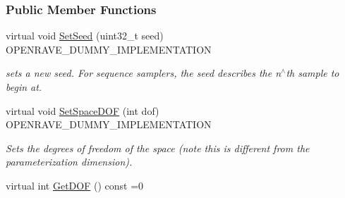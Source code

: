 \subsubsection*{Public Member Functions}
\begin{DoxyCompactItemize}
\item 
\hypertarget{classOpenRAVE_1_1SpaceSamplerBase_a0841286ea829596bce2ceab61ef3645c}{
virtual void \hyperlink{classOpenRAVE_1_1SpaceSamplerBase_a0841286ea829596bce2ceab61ef3645c}{SetSeed} (uint32\_\-t seed) OPENRAVE\_\-DUMMY\_\-IMPLEMENTATION}
\label{classOpenRAVE_1_1SpaceSamplerBase_a0841286ea829596bce2ceab61ef3645c}

\begin{DoxyCompactList}\small\item\em sets a new seed. For sequence samplers, the seed describes the n$^\wedge$th sample to begin at. \item\end{DoxyCompactList}\item 
\hypertarget{classOpenRAVE_1_1SpaceSamplerBase_adda3b11ca875fd0b90192d3700fdc024}{
virtual void \hyperlink{classOpenRAVE_1_1SpaceSamplerBase_adda3b11ca875fd0b90192d3700fdc024}{SetSpaceDOF} (int dof) OPENRAVE\_\-DUMMY\_\-IMPLEMENTATION}
\label{classOpenRAVE_1_1SpaceSamplerBase_adda3b11ca875fd0b90192d3700fdc024}

\begin{DoxyCompactList}\small\item\em Sets the degrees of freedom of the space (note this is different from the parameterization dimension). \item\end{DoxyCompactList}\item 
\hypertarget{classOpenRAVE_1_1SpaceSamplerBase_a50e5a2752e24bf4c5dfaa2873696a5a9}{
virtual int \hyperlink{classOpenRAVE_1_1SpaceSamplerBase_a50e5a2752e24bf4c5dfaa2873696a5a9}{GetDOF} () const =0}
\label{classOpenRAVE_1_1SpaceSamplerBase_a50e5a2752e24bf4c5dfaa2873696a5a9}


\end{DoxyCompactItemize}
